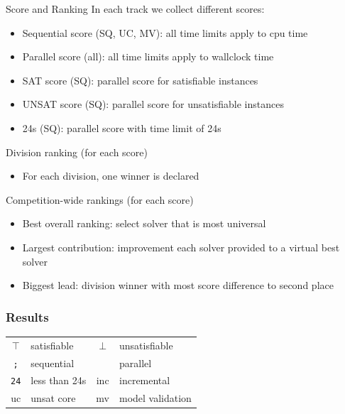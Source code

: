 \documentclass[table]{beamer}
\def\emph#1{\textcolor{MYblue}{#1}}
\begin{document}
\begin{frame}{Score and Ranking}
  In each track we collect different scores:
  \begin{itemize}
  \item \emph{Sequential score} (SQ, UC, MV): all time limits apply to cpu time
  \item \emph{Parallel score} (all): all time limits apply to wallclock time
  \item \emph{SAT score} (SQ): parallel score for \emph{satisfiable} instances
  \item \emph{UNSAT score} (SQ): parallel score for \emph{unsatisfiable} instances
  \item \emph{24s} (SQ): parallel score with time limit of \emph{24s}
  \end{itemize}
  \bigskip

  Division ranking (for each score)
  \begin{itemize}
  \item For each division, one winner is declared
  \end{itemize}

  \bigskip

  Competition-wide rankings (for each score)
  \begin{itemize}
  \item \emph{Best overall ranking}: select solver that is most universal  
  \item \emph{Largest contribution}: improvement each solver provided to a virtual best solver
  \item \emph{Biggest lead}: division winner with most score difference to second place
  \end{itemize}

\end{frame}

\newcommand{\seq}{\texttt{;}}
\newcommand{\paral}{\textbardbl}
\newcommand{\sat}{$\top$}
\newcommand{\unsat}{$\bot$}
\newcommand{\fast}{\texttt{24}}
\newcommand{\inc}{inc}
\newcommand{\uc}{uc}
\newcommand{\mv}{mv}
\newcommand{\cloud}{cloud}
\newcommand{\paralTrack}{parallel}

\begin{frame}
  \frametitle{Results}
  \begin{center}
    \begin{tabular}{|cl|cl|}
  \hline
  \sat & satisfiable & \unsat & unsatisfiable \\
  \seq & sequential & \paral & parallel \\
  \fast & less than 24s & \inc & incremental \\
  \uc & unsat core & \mv & model validation \\
  \hline
\end{tabular}
\end{center}
\end{frame}
\end{document}
